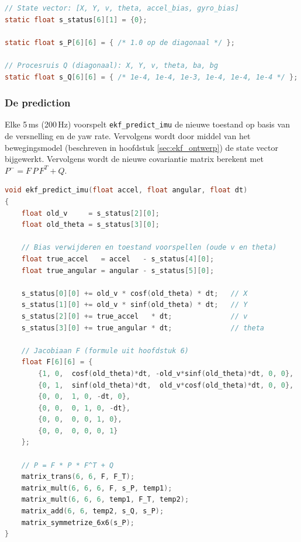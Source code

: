 \begin{lstlisting}[language=C, caption={covariantie en process noise matricen van het EKF.}, label={lst:ekf_state}]
// State vector: [X, Y, v, theta, accel_bias, gyro_bias]
static float s_status[6][1] = {0};

static float s_P[6][6] = { /* 1.0 op de diagonaal */ };

// Procesruis Q (diagonaal): X, Y, v, theta, ba, bg
static float s_Q[6][6] = { /* 1e-4, 1e-4, 1e-3, 1e-4, 1e-4, 1e-4 */ };
\end{lstlisting}

\subsubsection{De prediction}

Elke 5\,ms (200\,Hz) voorspelt \texttt{ekf\_predict\_imu} de nieuwe toestand op basis van de versnelling en de yaw rate. Vervolgens wordt door middel van het bewegingsmodel (beschreven in hoofdstuk \ref{sec:ekf_ontwerp}) de state vector bijgewerkt. Vervolgens wordt de nieuwe covariantie matrix berekent met $P^{-} = F\,P\,F^{T} + Q$.

\begin{lstlisting}[language=C, caption={De prediction stap van het EKF (ingekort).}, label={lst:ekf_predict}]
void ekf_predict_imu(float accel, float angular, float dt)
{
    float old_v     = s_status[2][0];
    float old_theta = s_status[3][0];

    // Bias verwijderen en toestand voorspellen (oude v en theta)
    float true_accel   = accel   - s_status[4][0];
    float true_angular = angular - s_status[5][0];

    s_status[0][0] += old_v * cosf(old_theta) * dt;   // X
    s_status[1][0] += old_v * sinf(old_theta) * dt;   // Y
    s_status[2][0] += true_accel   * dt;              // v
    s_status[3][0] += true_angular * dt;              // theta

    // Jacobiaan F (formule uit hoofdstuk 6)
    float F[6][6] = {
        {1, 0,  cosf(old_theta)*dt, -old_v*sinf(old_theta)*dt, 0, 0},
        {0, 1,  sinf(old_theta)*dt,  old_v*cosf(old_theta)*dt, 0, 0},
        {0, 0,  1, 0, -dt, 0},
        {0, 0,  0, 1, 0, -dt},
        {0, 0,  0, 0, 1, 0},
        {0, 0,  0, 0, 0, 1}
    };

    // P = F * P * F^T + Q
    matrix_trans(6, 6, F, F_T);
    matrix_mult(6, 6, 6, F, s_P, temp1);
    matrix_mult(6, 6, 6, temp1, F_T, temp2);
    matrix_add(6, 6, temp2, s_Q, s_P);
    matrix_symmetrize_6x6(s_P);
}
\end{lstlisting}

